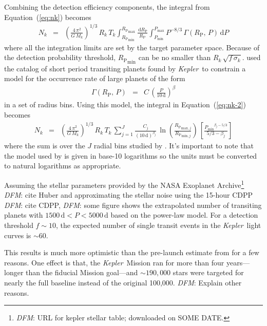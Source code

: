 \documentclass[12pt,preprint]{aastex}
\newcommand{\project}[1]{\textsl{#1}}
\newcommand{\kepler}{\project{Kepler}}
\renewcommand{\eqref}[1]{\ref{eq:#1}}
\newcommand{\Eq}[1]{Equation~(\eqref{#1})}
\newcommand{\eq}[1]{\Eq{#1}}
\newcommand{\eqlabel}[1]{\label{eq:#1}}
\newcommand{\dd}{\ensuremath{\,\mathrm{d}}}
\newcommand{\todo}[3]{{\color{#2}\emph{#1}: #3}}
\newcommand{\dfmtodo}[1]{\todo{DFM}{red}{#1}}
\newcommand{\period}{{\ensuremath{P}}}
\newcommand{\rp}{{\ensuremath{R_\mathrm{P}}}}
\newcommand{\rate}{{\ensuremath{\Gamma}}}
\begin{document}
Combining the detection efficiency components, the integral from \eq{nk}
becomes
\begin{eqnarray}\eqlabel{nk-2}
N_k &=& \left( \frac{4\,\pi^2}{G\,M_k} \right)^{1/3} \, R_k \, T_k
    \int_{\rp_\mathrm{min}} ^{\rp_\mathrm{max}} \frac{\dd\rp}{\rp}
    \int_{\period_\mathrm{min}} ^{\period_\mathrm{max}}
        \period^{-8/3}\,\rate(\rp,\,\period) \dd\period
\end{eqnarray}
where all the integration limits are set by the target parameter space.
Because of the detection probability threshold, $\rp_\mathrm{min}$ can be no
smaller than $R_k\,\sqrt{f\,\sigma_k}$.
\citet{Dong:2013} used the catalog of short period transiting planets found
by \kepler\ to constrain a model for the occurrence rate of large planets of
the form
\begin{eqnarray}
\rate(\rp,\,\period) &=& C\,\left(\frac{\period}{10\,\mathrm{d}}\right)^\beta
\end{eqnarray}
in a set of radius bins.
Using this model, the integral in \eq{nk-2} becomes
\begin{eqnarray}
N_k &=& \left( \frac{4\,\pi^2}{G\,M_k} \right)^{1/3} \, R_k \, T_k \,
    \sum_{j=1}^J \frac{C_j}{(10\,\mathrm{d})^{\beta_j}}\,
    \ln \left( \frac{\rp_{\mathrm{max},j}}{\rp_{\mathrm{min},j}} \right) \,
    \left[ \frac{{\period_\mathrm{min}}^{\beta_j - 5/3}}{5/3-\beta_j} \right]
\end{eqnarray}
where the sum is over the $J$ radial bins studied by \citet{Dong:2013}.
It's important to note that the model used by \citet{Dong:2013} is given in
base-10 logarithms so the units must be converted to natural logarithms as
appropriate.

Assuming the stellar parameters provided by the NASA Exoplanet
Archive\footnote{\dfmtodo{URL for kepler stellar table; downloaded on SOME
DATE.}} \dfmtodo{cite Huber} and approximating the stellar noise using the
15-hour CDPP \dfmtodo{cite CDPP}, \dfmtodo{some figure} shows the extrapolated
number of transiting planets with $1500\,\mathrm{d} < \period <
5000\,\mathrm{d}$ based on the \citet{Dong:2013} power-law model.
For a detection threshold $f\sim10$, the expected number of single transit
events in the \kepler\ light curves is $\sim 60$.

This results is much more optimistic than the pre-launch estimate from
\citet{Yee:2008} for a few reasons.
One effect is that, the \kepler\ Mission ran for more than four
years---longer than the fiducial Mission goal---and $\sim190,000$ stars were
targeted for nearly the full baseline instead of the original 100,000.
\dfmtodo{Explain other reasons.}
\end{document}
